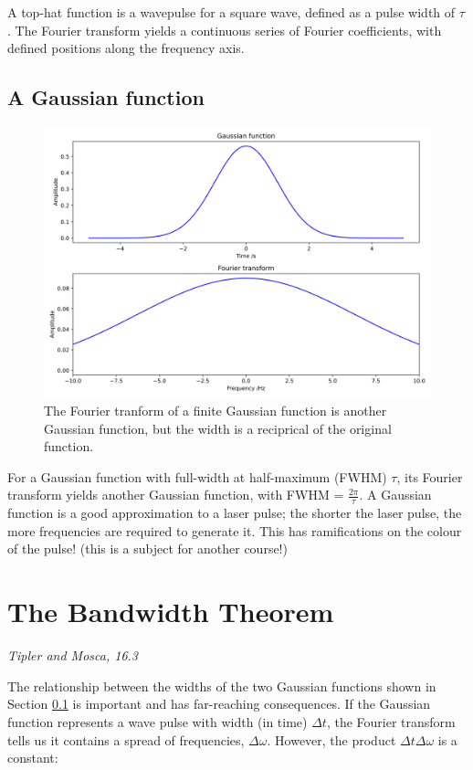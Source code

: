 \documentclass[
]{book}
\begin{document}
A top-hat function is a wavepulse for a square wave, defined as a pulse width of \(\tau\). The Fourier transform yields a continuous series of Fourier coefficients, with defined positions along the frequency axis.

\hypertarget{sec:ch11-ftgaussian}{%
\subsection{A Gaussian function}\label{sec:ch11-ftgaussian}}

\begin{figure}

{\centering \includegraphics[width=0.7\linewidth]{visualisations/ch11-ftgaussian1} 

}

\caption{The Fourier tranform of a finite Gaussian function is another Gaussian function, but the width is a reciprical of the original function.}\label{fig:ch11-ftgaussian1}
\end{figure}

For a Gaussian function with full-width at half-maximum (FWHM) \(\tau\), its Fourier transform yields another Gaussian function, with FWHM = \(\frac{2\pi}{\tau}\). A Gaussian function is a good approximation to a laser pulse; the shorter the laser pulse, the more frequencies are required to generate it. This has ramifications on the colour of the pulse! (this is a subject for another course!)

\hypertarget{sec:ch11-bandwidththeorem}{%
\section{The Bandwidth Theorem}\label{sec:ch11-bandwidththeorem}}

\emph{Tipler and Mosca, 16.3}

The relationship between the widths of the two Gaussian functions shown in Section \ref{sec:ch11-ftgaussian} is important and has far-reaching consequences. If the Gaussian function represents a wave pulse with width (in time) \(\Delta t\), the Fourier transform tells us it contains a spread of frequencies, \(\Delta \omega\). However, the product \(\Delta t \Delta \omega\) is a constant:
\end{document}
